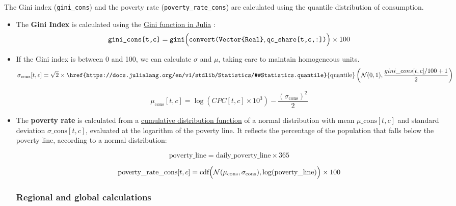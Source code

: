 \documentclass[
]{article}
\begin{document}
The Gini index (\texttt{gini\_cons}) and the poverty rate
(\texttt{poverty\_rate\_cons}) are calculated using the quantile
distribution of consumption.

\begin{itemize}
\item 
  The \textbf{Gini Index} is calculated using the \href{https://docs.juliahub.com/General/Inequality/stable/library/#Inequality.gini}{Gini function in Julia} :
  \begin{equation}
    \texttt{gini\_cons[t,c]} = \texttt{gini} \Bigl( \texttt{convert(Vector\{Real\}}, \texttt{qc\_share[t,c,:])} \Bigr) \times 100
  \end{equation}

\item
  If the Gini index is between 0 and 100, we can calculate $\sigma$ and $\mu$, taking care to maintain homogeneous units.
  \begin{equation}
  \sigma_{\text{cons}}[t,c] = \sqrt{2} \times \href{https://docs.julialang.org/en/v1/stdlib/Statistics/#Statistics.quantile}{\text{quantile}} \left(\mathcal{N}(0,1), \frac{gini\_cons[t,c]/100 + 1}{2}\right) 
  \end{equation}

  \begin{equation}
 \mu_{\text{cons}}[t,c] = \log(CPC[t,c] \times 10^3) - \frac{(\sigma_{\text{cons}})^2}{2} 
\end{equation}

\item
  The \textbf{poverty rate} is calculated from a \href{https://juliastats.org/Distributions.jl/stable/univariate/#Probability-Evaluation}{cumulative distribution function} 
  of a normal distribution with mean \texttt{$\mu\_{\text{cons}}[t,c]$}
  and standard deviation \texttt{$\sigma\_{\text{cons}}[t,c]$}, evaluated at the
  logarithm of the poverty line. It reflects the percentage of the
  population that falls below the poverty line, according to a normal distribution:

  \begin{equation}
    \text{poverty\_line} = \text{daily\_poverty\_line} \times 365
  \end{equation}

\begin{equation}
 \text{poverty\_rate\_cons}[t,c] = {\text{cdf}} \Bigl( \mathcal{N}(\mu_{\text{cons}},\sigma_{\text{cons}}), \log(\text{poverty\_line}) \Bigr) \times 100 
\end{equation}

\subsubsection{Regional and global calculations}\label{regional-and-global-calculations}
\end{itemize}
\end{document}
